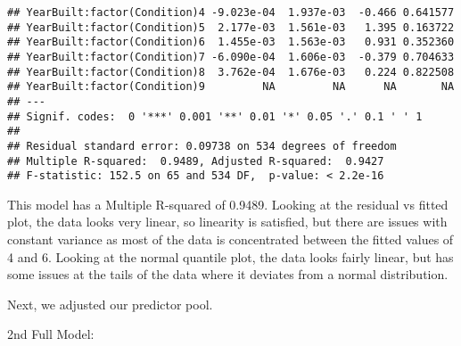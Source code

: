 \documentclass[
]{article}
\begin{document}
\begin{verbatim}
## YearBuilt:factor(Condition)4 -9.023e-04  1.937e-03  -0.466 0.641577    
## YearBuilt:factor(Condition)5  2.177e-03  1.561e-03   1.395 0.163722    
## YearBuilt:factor(Condition)6  1.455e-03  1.563e-03   0.931 0.352360    
## YearBuilt:factor(Condition)7 -6.090e-04  1.606e-03  -0.379 0.704633    
## YearBuilt:factor(Condition)8  3.762e-04  1.676e-03   0.224 0.822508    
## YearBuilt:factor(Condition)9         NA         NA      NA       NA    
## ---
## Signif. codes:  0 '***' 0.001 '**' 0.01 '*' 0.05 '.' 0.1 ' ' 1
## 
## Residual standard error: 0.09738 on 534 degrees of freedom
## Multiple R-squared:  0.9489, Adjusted R-squared:  0.9427 
## F-statistic: 152.5 on 65 and 534 DF,  p-value: < 2.2e-16
\end{verbatim}

This model has a Multiple R-squared of 0.9489. Looking at the residual
vs fitted plot, the data looks very linear, so linearity is satisfied,
but there are issues with constant variance as most of the data is
concentrated between the fitted values of 4 and 6. Looking at the normal
quantile plot, the data looks fairly linear, but has some issues at the
tails of the data where it deviates from a normal distribution.

Next, we adjusted our predictor pool.

2nd Full Model:
\end{document}
